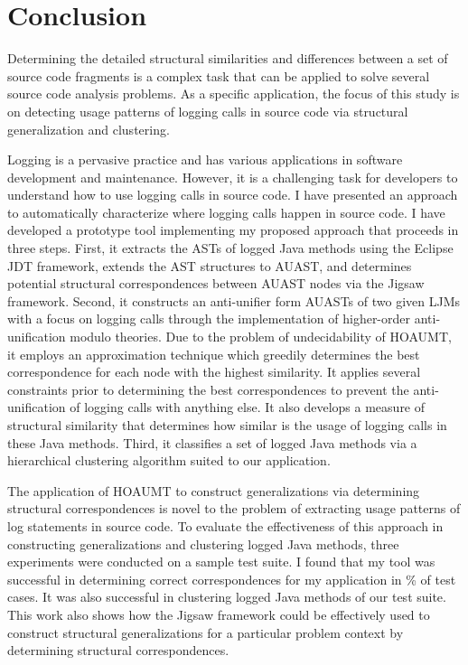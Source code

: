 
\chapter{Conclusion}  \label{conc}
Determining the detailed structural similarities and differences between a set of source code fragments is a complex task that can be applied to solve several source code analysis problems. As a specific application, the focus of this study is on detecting usage patterns of logging calls in source code via structural generalization and clustering.

Logging is a pervasive practice and has various applications in software development and maintenance. However, it is a challenging task for developers to understand how to use logging calls in source code. I have presented an approach to automatically characterize where logging calls happen in source code. 
I have developed a prototype tool implementing my proposed approach that proceeds in three steps. First, it extracts the ASTs of logged Java methods using the Eclipse JDT framework, extends the AST structures to AUAST, and determines potential structural correspondences between AUAST nodes via the Jigsaw framework. Second, it constructs an anti-unifier form AUASTs of two given LJMs with a focus on logging calls through the implementation of higher-order anti-unification modulo theories. Due to the problem of undecidability of HOAUMT, it employs an approximation technique which greedily determines the best correspondence for each node with the highest similarity. It applies several constraints prior to determining the best correspondences to prevent the anti-unification of logging calls with anything else. It also develops a measure of structural similarity that determines how similar is the usage of logging calls in these Java methods. Third, it classifies a set of logged Java methods via a hierarchical clustering algorithm suited to our application.


The application of HOAUMT to construct generalizations via determining structural correspondences is novel to the problem of extracting usage patterns of log statements in source code. To evaluate the effectiveness of this approach in constructing generalizations and clustering logged Java methods, three experiments were conducted on a sample test suite. I found that my tool was successful in determining correct correspondences for my application in \% of test cases. It was also successful in clustering logged Java methods of our test suite. This work also shows how the Jigsaw framework could be effectively used to construct structural generalizations for a particular problem context by determining structural correspondences.
 
